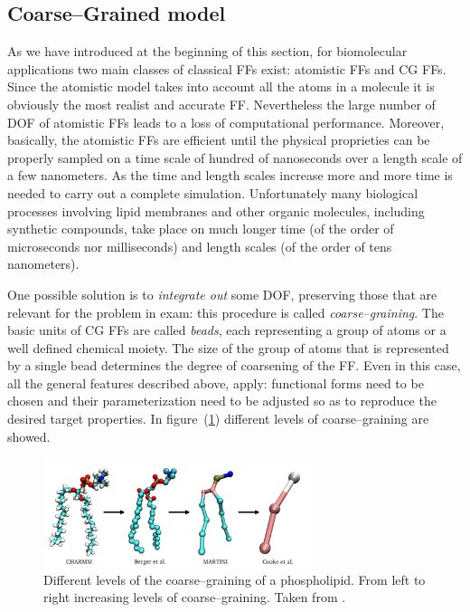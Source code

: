 \subsection{Coarse--Grained model}
\label{sec:CGModel}
As we have introduced at the beginning of this section, for biomolecular applications two main classes of
classical \acp{FF} exist: atomistic \acp{FF} and \ac{CG} \acp{FF}. Since the atomistic model takes into account
all the atoms in a molecule it is obviously the most realist and accurate \ac{FF}. Nevertheless the large number
of \ac{DOF} of atomistic \acp{FF} leads to a loss of computational performance. Moreover, basically, the
atomistic \acp{FF} are efficient until the physical proprieties can be properly sampled on a time scale of 
hundred of nanoseconds over a length scale of a few nanometers. As the time and length scales increase more and 
more time is needed to carry out a complete simulation. Unfortunately many biological processes involving lipid 
membranes and other organic molecules, including synthetic compounds, take place on much longer time (of the 
order of microseconds nor milliseconds) and length scales (of the order of tens nanometers).

One possible solution is to \textit{integrate out} some \ac{DOF}, preserving those that are relevant for the
problem in exam: this procedure is called \textit{coarse--graining}. The basic units of \ac{CG} \acp{FF} are
called \textit{beads}, each representing a group of atoms or a well defined chemical moiety. The size of the
group of atoms that is represented by a single bead determines the degree of coarsening of the \ac{FF}. Even in
this case, all the general features described above, apply: functional forms need to be chosen and their
parameterization need to be adjusted so as to reproduce the desired target properties. In figure~(\ref{fig:CGLevels}) different levels of coarse--graining are showed.
\begin{figure}[h!t]
	\centering
	\includegraphics[width=0.7\textwidth]{./img/CGMapping}
	\caption{Different levels of the coarse--graining of a phospholipid. From left to right increasing levels of coarse--graining. Taken from \cite{CoarseGrainingMapping}.}
	\label{fig:CGLevels}
\end{figure}


